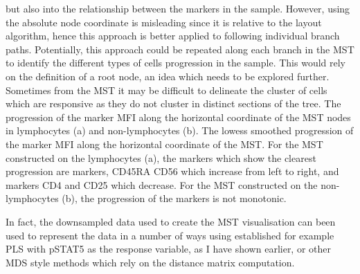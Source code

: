 but also into the relationship between the markers in the sample.
However, using the absolute node coordinate is misleading since it is relative to the layout algorithm, hence this approach is better applied to following individual branch paths.
Potentially, this approach could be repeated along each branch in the \gls{MST} to identify the different types of cells progression in the sample.
This would rely on the definition of a root node, an idea which needs to be explored further.
Sometimes from the MST it may be difficult to delineate the cluster of cells which are responsive as they do not cluster in distinct sections of the tree.
{ The progression of the marker MFI along the horizontal coordinate of the \gls{MST} nodes in lymphocytes (a) and non-lymphocytes (b). }
{
  The lowess smoothed progression of the marker MFI along the horizontal coordinate of the \gls{MST}.
  For the \gls{MST} constructed on the lymphocytes (a), the markers which show the clearest progression are markers, CD45RA
  CD56 which increase from left to right,
  and markers CD4 and CD25 which decrease.
  For the \gls{MST} constructed on the non-lymphocytes (b), the progression of the markers is not monotonic.
}


In fact, the downsampled data used to create the \gls{MST} visualisation can been used to represent the data in a number of ways using established
for example \gls{PLS} with pSTAT5 as the response variable, as I have shown earlier, or other \gls{MDS} style methods which rely on the distance matrix computation.  

